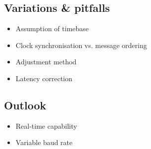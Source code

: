 \subsection{Variations \& pitfalls}
\begin{center}
\begin{itemize}
  \item \begin{large}Assumption of timebase\end{large}
  \item \begin{large}Clock synchronisation vs. message ordering\end{large}
  \item \begin{large}Adjustment method\end{large}
  \item \begin{large}Latency correction\end{large}
\end{itemize}
\end{center}


\subsection{Outlook}
\begin{center}
    \begin{itemize}
      \item Real-time capability
      \item Variable baud rate
    \end{itemize}
\end{center}


